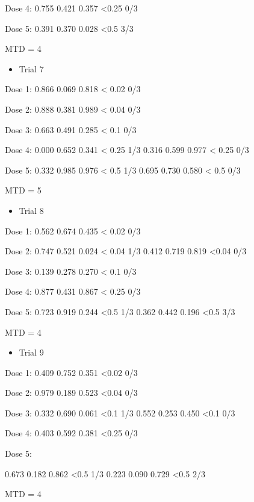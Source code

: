 \documentclass[]{article}
\providecommand{\tightlist}{%
  \setlength{\itemsep}{0pt}\setlength{\parskip}{0pt}}
\begin{document}
Dose 4: 0.755 0.421 0.357 \textless0.25 0/3

Dose 5: 0.391 0.370 0.028 \textless0.5 3/3

MTD = 4

\begin{itemize}
\tightlist
\item
  Trial 7
\end{itemize}

Dose 1: 0.866 0.069 0.818 \textless{} 0.02 0/3

Dose 2: 0.888 0.381 0.989 \textless{} 0.04 0/3

Dose 3: 0.663 0.491 0.285 \textless{} 0.1 0/3

Dose 4: 0.000 0.652 0.341 \textless{} 0.25 1/3 \textbar{} 0.316 0.599
0.977 \textless{} 0.25 0/3

Dose 5: 0.332 0.985 0.976 \textless{} 0.5 1/3 \textbar{} 0.695 0.730
0.580 \textless{} 0.5 0/3

MTD = 5

\begin{itemize}
\tightlist
\item
  Trial 8
\end{itemize}

Dose 1: 0.562 0.674 0.435 \textless{} 0.02 0/3

Dose 2: 0.747 0.521 0.024 \textless{} 0.04 1/3 \textbar{} 0.412 0.719
0.819 \textless0.04 0/3

Dose 3: 0.139 0.278 0.270 \textless{} 0.1 0/3

Dose 4: 0.877 0.431 0.867 \textless{} 0.25 0/3

Dose 5: 0.723 0.919 0.244 \textless0.5 1/3 \textbar{} 0.362 0.442 0.196
\textless0.5 3/3

MTD = 4

\begin{itemize}
\tightlist
\item
  Trial 9
\end{itemize}

Dose 1: 0.409 0.752 0.351 \textless0.02 0/3

Dose 2: 0.979 0.189 0.523 \textless0.04 0/3

Dose 3: 0.332 0.690 0.061 \textless0.1 1/3 \textbar{} 0.552 0.253 0.450
\textless0.1 0/3

Dose 4: 0.403 0.592 0.381 \textless0.25 0/3

Dose 5:

0.673 0.182 0.862 \textless0.5 1/3 \textbar{} 0.223 0.090 0.729
\textless0.5 2/3

MTD = 4
\end{document}

